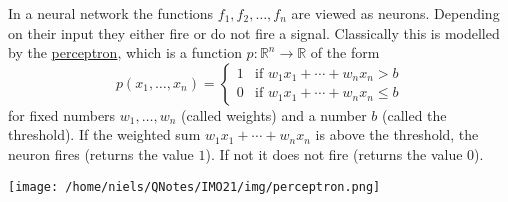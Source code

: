 In a neural
network the functions $f_1, f_2, \dots, f_n$ are viewed as neurons. Depending on their
input they either fire or do not fire a signal. Classically this is
modelled by the \href{https://en.wikipedia.org/wiki/Perceptron}{perceptron},
which is a function $p:\mathbb{R}^n\rightarrow \mathbb{R}$ of the form
\begin{equation}\label{relu}
  p(x_1, \dots, x_n) =
  \begin{cases}
    1 & \text{if } w_1 x_1 + \cdots + w_n x_n > b    \\
    0 & \text{if } w_1 x_1 + \cdots + w_n x_n \leq b
  \end{cases}
\end{equation}
for fixed numbers $w_1, \dots, w_n$ (called weights) and a number $b$ (called the threshold).
If the weighted sum $w_1 x_1 + \cdots + w_n x_n$ is above the threshold, the neuron
fires (returns the value $1$). If not it does not fire (returns the value $0$).

\begin{center}\texttt{[image: /home/niels/QNotes/IMO21/img/perceptron.png]}\end{center}

